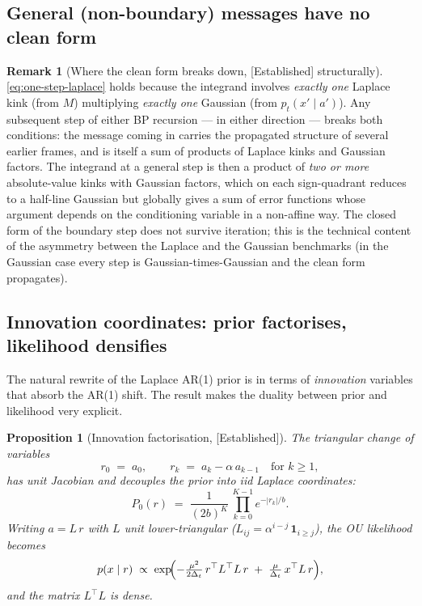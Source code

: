 \documentclass[11pt]{article}
\newtheorem{proposition}{Proposition}
\theoremstyle{definition}
\newtheorem{remark}{Remark}
\newcommand{\Detl}{\Delta_t}
\newcommand{\Established}{\textcolor{black!50!green}{\textsf{[Established]}}}
\begin{document}
\subsection{General (non-boundary) messages have no clean form}\label{sec:K2-general}

\begin{remark}[Where the clean form breaks down, \Established
structurally]\label{rmk:causal-asym}
\eqref{eq:one-step-laplace} holds because the integrand involves
\emph{exactly one} Laplace kink (from \(M\)) multiplying \emph{exactly
one} Gaussian (from \(p_t(x' \mid a')\)). Any subsequent step of
either BP recursion --- in either direction --- breaks both
conditions: the message coming in carries the propagated structure of
several earlier frames, and is itself a sum of products of Laplace
kinks and Gaussian factors. The integrand at a general step is then a
product of \emph{two or more} absolute-value kinks with Gaussian
factors, which on each sign-quadrant reduces to a half-line Gaussian
but globally gives a sum of error functions whose argument depends on
the conditioning variable in a non-affine way. The closed form of the
boundary step does not survive iteration; this is the technical
content of the asymmetry between the Laplace and the Gaussian
benchmarks (in the Gaussian case every step is Gaussian-times-Gaussian
and the clean form propagates).
\end{remark}

\subsection{Innovation coordinates: prior factorises, likelihood
densifies}\label{sec:K2-innov}

The natural rewrite of the Laplace AR(1) prior is in terms of
\emph{innovation} variables that absorb the AR(1) shift. The result
makes the duality between prior and likelihood very explicit.

\begin{proposition}[Innovation factorisation, \Established]\label{prop:innov}
The triangular change of variables
\begin{equation}\label{eq:innov-def}
    r_0 \;=\; a_0,
    \qquad
    r_k \;=\; a_k - \alpha\, a_{k-1}
    \quad\text{for } k \geq 1,
\end{equation}
has unit Jacobian and decouples the prior into iid Laplace
coordinates:
\begin{equation}\label{eq:innov-prior}
    P_0(r) \;=\; \frac{1}{(2 b)^K}\, \prod_{k = 0}^{K - 1}
                 e^{-|r_k| / b}.
\end{equation}
Writing \(a = L\, r\) with \(L\) unit lower-triangular
(\(L_{ij} = \alpha^{i - j}\, \mathbf{1}_{i \geq j}\)), the OU
likelihood becomes
\begin{equation}\label{eq:innov-likelihood}
    p(x \mid r)
    \;\propto\;
    \exp\!\Bigl(- \tfrac{\mu^2}{2 \Detl}\,
        r^\top L^\top L\, r
        \;+\; \tfrac{\mu}{\Detl}\, x^\top L\, r\Bigr),
\end{equation}
and the matrix \(L^\top L\) is dense.
\end{proposition}
\end{document}

